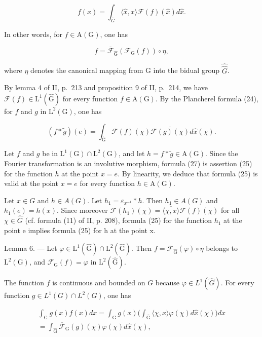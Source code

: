 \[
f (x) = \int_ {\widehat {G}} \langle \widehat {x}, x \rangle \mathcal {F} (f) (\widehat {x}) d \widehat {x}.\tag{25}
\]

In other words, for \(f \in \mathrm{A}(\mathrm{G})\), one has

\[
f = \overline {{\mathcal {F}}} _ {\widehat {\mathrm{G}}} (\mathcal {F} _ {\mathrm{G}} (f)) \circ \eta ,\tag{26}
\]

where \(\eta\) denotes the canonical mapping from G into the bidual group \(\widehat{\widehat{G}}\).

By lemma 4 of II, p.~213 and proposition 9 of II, p.~214, we have \(\mathcal{F}(f) \in \mathrm{L}^1(\widehat{\mathrm{G}})\) for every function \(f \in \mathrm{A}(\mathrm{G})\). By the Plancherel formula (24), for \(f\) and \(g\) in \(\mathrm{L}^2(\mathrm{G})\), one has

\[
(f * \widetilde {g}) (e) = \int_ {\widehat {\mathrm{G}}} \mathcal {F} (f) (\chi) \overline {{\mathcal {F} (g) (\chi)}} d \widehat {x} (\chi).\tag{27}
\]

Let \(f\) and \(g\) be in \(\mathrm{L}^1(\mathrm{G}) \cap \mathrm{L}^2(\mathrm{G})\), and let \(h = f * \widetilde{g} \in \mathrm{A}(\mathrm{G})\). Since the Fourier transformation is an involutive morphism, formula (27) is assertion (25) for the function \(h\) at the point \(x = e\). By linearity, we deduce that formula (25) is valid at the point \(x = e\) for every function \(h \in \mathrm{A}(\mathrm{G})\).

Let \(x \in G\) and \(h \in A(G)\). Let \(h_{1} = \varepsilon_{x^{-1}} * h\). Then \(h_{1} \in A(G)\) and \(h_{1}(e) = h(x)\). Since moreover \(\mathcal{F}(h_{1})(\chi) = \overline{\langle\chi, x\rangle}\mathcal{F}(f)(\chi)\) for all \(\chi \in \widehat{G}\) (cf. formula (11) of II, p. 208), formula (25) for the function \(h_{1}\) at the point e implies formula (25) for h at the point x.

Lemma 6. — Let \(\varphi\in\mathrm{L}^{1}(\widehat{\mathrm{G}})\cap\mathrm{L}^{2}(\widehat{\mathrm{G}})\). Then \(f=\overline{\mathcal{F}}_{\widehat{\mathrm{G}}}(\varphi)\circ\eta\) belongs to \(\mathrm{L}^{2}(\mathrm{G})\), and \(\mathcal{F}_{\mathrm{G}}(f)=\varphi\) in \(\mathrm{L}^{2}(\widehat{\mathrm{G}})\).

The function \(f\) is continuous and bounded on \(G\) because \(\varphi \in L^{1}(\widehat{G})\). For every function \(g \in L^{1}(G) \cap L^{2}(G)\), one has

\[
\begin{array}{r} \int_ {\mathrm{G}} g (x) f (x) d x = \int_ {\mathrm{G}} g (x) \Big (\int_ {\widehat {\mathrm{G}}} \langle \chi , x \rangle \varphi (\chi) d \widehat {x} (\chi) \Big) d x \\ = \int_ {\widehat {\mathrm{G}}} \overline {{\mathcal {F}}} _ {\mathrm{G}} (g) (\chi) \varphi (\chi) d \widehat {x} (\chi), \end{array}\tag{28}
\]

